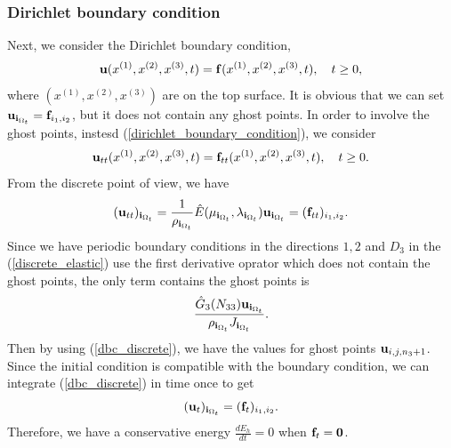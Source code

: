 \documentclass[a4paper]{article}
\begin{document}
\subsubsection{Dirichlet boundary condition}
Next, we consider the Dirichlet boundary condition, 
\begin{equation}\label{dirichlet_boundary_condition}
{\bf u}(x^{(1)},x^{(2)},x^{(3)},t) = {\bf f}(x^{(1)},x^{(2)},x^{(3)},t),  \ \ \ t \geq 0,
\end{equation}
where $(x^{(1)},x^{(2)},x^{(3)})$ are on the top surface. It is obvious that we can set ${\bf u}_{{\bf i}_{\Omega_t}} = {\bf f}_{i_1,i_2}$, but it does not contain any ghost points. In order to involve the ghost points, instesd (\ref{dirichlet_boundary_condition}), we consider
\begin{equation}
{\bf u}_{tt}(x^{(1)},x^{(2)},x^{(3)},t) = {\bf f}_{tt}(x^{(1)},x^{(2)},x^{(3)},t),  \ \ \ t \geq 0.
\end{equation}
From the discrete point of view, we have
\begin{equation}\label{dbc_discrete}
({\bf u}_{tt})_{{\bf i}_{\Omega_t}}=\frac{1}{\rho_{{\bf i}_{\Omega_t}}} \hat{E}(\mu_{{\bf i}_{\Omega_t}},\lambda_{{\bf i}_{\Omega_t}}){\bf u}_{{\bf i}_{\Omega_t}} = ({\bf f}_{tt})_{i_1,i_2}.
\end{equation}
Since we have periodic boundary conditions in the directions $1,2$ and $D_3$ in the (\ref{discrete_elastic}) use the first derivative oprator which does not contain the ghost points, the only term contains the ghost points is 
\[\frac{\hat{G}_3(N_{33}){\bf u}_{{\bf i}_{\Omega_t}}}{\rho_{{\bf i}_{\Omega_t}}J_{{\bf i}_{\Omega_t}}}.\]
Then by using (\ref{dbc_discrete}), we have the values for ghost points ${\bf u}_{i,j,n_3+1}$. Since the initial condition is compatible with the boundary condition, we can integrate (\ref{dbc_discrete}) in time once to get
\[({\bf u}_t)_{{\bf i}_{\Omega_t}} = ({\bf f}_t)_{i_1,i_2}.\]
Therefore, we have a conservative energy $\frac{dE_h}{dt} = 0$ when ${\bf f}_t = {\bf 0}$.
\end{document}
